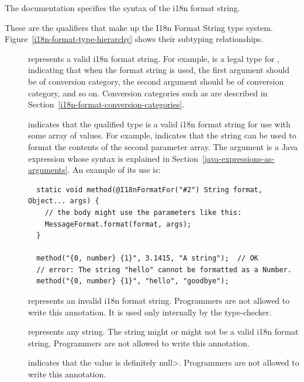The  documentation
specifies the syntax of the i18n format string.

These are the qualifiers that make up the I18n Format String type system.
Figure~\ref{i18n-format-type-hierarchy} shows their subtyping relationships.

\begin{description}

\item[]
  represents a valid i18n format string. For example,
   is a legal type for
  , indicating that when the format
  string is used,
  the first argument should be of  conversion category,
  the second argument should be of  conversion category, and so on.
  Conversion categories such as  are described in
  Section~\ref{i18n-format-conversion-categories}.

\item[]
  indicates that the qualified type is a valid i18n format string for use
  with some array of values.  For example,
   indicates that the string can be used to
  format the contents of the second parameter array.
  The argument is a Java expression whose syntax
  is explained in Section~\ref{java-expressions-as-arguments}.
  An example of its use is:

\begin{Verbatim}
  static void method(@I18nFormatFor("#2") String format, Object... args) {
    // the body might use the parameters like this:
    MessageFormat.format(format, args);
  }

  method("{0, number} {1}", 3.1415, "A string");  // OK
  // error: The string "hello" cannot be formatted as a Number.
  method("{0, number} {1}", "hello", "goodbye");
\end{Verbatim}

\item[]
  represents an invalid i18n format string. Programmers are not allowed to
  write this annotation. It is used only internally by the type-checker.

\item[]
  represents any string.  The string might or might not be a valid i18n
  format string.  Programmers are not allowed to write this annotation.

\item[]
  indicates that the value is definitely \<null>. Programmers are not allowed
  to write this annotation.
\end{description}


